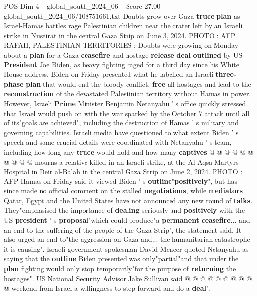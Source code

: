 \begin{textsample}{POS Dim 4 – global\_south\_2024\_06 – Score 27.00 – global\_south\_2024\_06/108751661.txt}  \label{ex:f4_pos_082}
Doubts grow over Gaza \textbf{truce} \textbf{plan} as Israel-Hamas battles rage Palestinian children near the crater left by an Israeli strike in Nuseirat in the central Gaza Strip on June 3, 2024.
PHOTO : AFP RAFAH, PALESTINIAN TERRITORIES : Doubts were growing on Monday about a \textbf{plan} for a Gaza \textbf{ceasefire} and hostage \textbf{release} \textbf{deal} \textbf{outlined} by US \textbf{President} Joe Biden, as heavy fighting raged for a third day since his White House address.
Biden on Friday presented what he labelled an Israeli \textbf{three-phase} \textbf{plan} that would end the bloody conflict, \textbf{free} all hostages and lead to the \textbf{reconstruction} of the devastated Palestinian territory without Hamas in power.
However, Israeli \textbf{Prime} Minister Benjamin Netanyahu ' s office quickly stressed that Israel would push on with the war sparked by the October 7 attack until all of its"goals are achieved", including the destruction of Hamas ' s military and governing capabilities.
Israeli media have questioned to what extent Biden ' s speech and some crucial details were coordinated with Netanyahu ' s team, including how long any \textbf{truce} would hold and how many \textbf{captives} @ @ @ @ @ @ @ @ @ @ mourns a relative killed in an Israeli strike, at the Al-Aqsa Martyrs Hospital in Deir al-Balah in the central Gaza Strip on June 2, 2024.
PHOTO : AFP Hamas on Friday said it viewed Biden ' s \textbf{outline}"\textbf{positively}", but has since made no official comment on the stalled \textbf{negotiations}, while \textbf{mediators} Qatar, Egypt and the United States have not announced any new round of \textbf{talks}.
They"emphasised the importance of \textbf{dealing} seriously and \textbf{positively} with the US \textbf{president} ' s \textbf{proposal}"which could produce"a \textbf{permanent} \textbf{ceasefire}... and an end to the suffering of the people of the Gaza Strip", the statement said.
It also urged an end to"the aggression on Gaza and... the humanitarian catastrophe it is causing".
Israeli government spokesman David Mencer quoted Netanyahu as saying that the \textbf{outline} Biden presented was only"partial"and that under the \textbf{plan} fighting would only stop temporarily"for the purpose of \textbf{returning} the hostages".
US National Security Advisor Jake Sullivan said @ @ @ @ @ @ @ @ @ @ weekend from Israel a willingness to step forward and do a \textbf{deal}".

\end{textsample}
